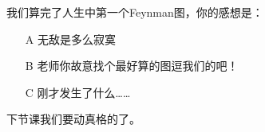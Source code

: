 \documentclass[CJK]{beamer}
\begin{document}
\begin{frame}
\bch
我们算完了人生中第一个Feynman图，你的感想是：
\begin{itemize}
\item[A]{无敌是多么寂寞}
\item[B]{老师你故意找个最好算的图逗我们的吧！}
\item[C]{刚才发生了什么……}
\end{itemize}
\ech
\end{frame}

\begin{frame}
\bch

下节课我们要动真格的了。
\ech
\end{frame}
\end{document}
